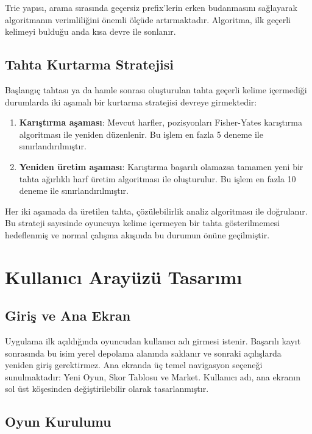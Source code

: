 \documentclass[conference]{IEEEtran}
\begin{document}
Trie yapısı, arama sırasında geçersiz prefix'lerin erken budanmasını sağlayarak algoritmanın verimliliğini önemli ölçüde artırmaktadır. Algoritma, ilk geçerli kelimeyi bulduğu anda kısa devre ile sonlanır.

\subsection{Tahta Kurtarma Stratejisi}

Başlangıç tahtası ya da hamle sonrası oluşturulan tahta geçerli kelime içermediği durumlarda iki aşamalı bir kurtarma stratejisi devreye girmektedir:

\begin{enumerate}
  \item \textbf{Karıştırma aşaması}: Mevcut harfler, pozisyonları Fisher-Yates karıştırma algoritması \cite{fisher_yates_shuffle} ile yeniden düzenlenir. Bu işlem en fazla 5 deneme ile sınırlandırılmıştır.
  \item \textbf{Yeniden üretim aşaması}: Karıştırma başarılı olamazsa tamamen yeni bir tahta ağırlıklı harf üretim algoritması ile oluşturulur. Bu işlem en fazla 10 deneme ile sınırlandırılmıştır.
\end{enumerate}

Her iki aşamada da üretilen tahta, çözülebilirlik analiz algoritması ile doğrulanır. Bu strateji sayesinde oyuncuya kelime içermeyen bir tahta gösterilmemesi hedeflenmiş ve normal çalışma akışında bu durumun önüne geçilmiştir.

\section{Kullanıcı Arayüzü Tasarımı}

\subsection{Giriş ve Ana Ekran}

Uygulama ilk açıldığında oyuncudan kullanıcı adı girmesi istenir. Başarılı kayıt sonrasında bu isim yerel depolama alanında saklanır ve sonraki açılışlarda yeniden giriş gerektirmez. Ana ekranda üç temel navigasyon seçeneği sunulmaktadır: Yeni Oyun, Skor Tablosu ve Market. Kullanıcı adı, ana ekranın sol üst köşesinden değiştirilebilir olarak tasarlanmıştır.

\subsection{Oyun Kurulumu}
\end{document}
